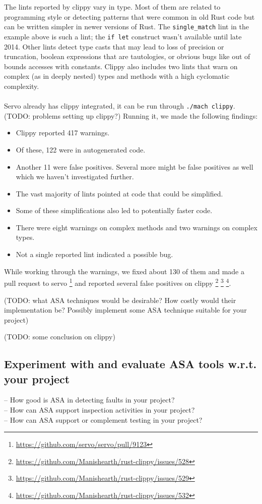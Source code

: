 \documentclass{scrartcl}
\newcommand{\todo}[1] {{\color{red}(TODO: #1)}}
\begin{document}
The lints reported by clippy vary in type. Most of them are related to programming style or detecting patterns that were common in old Rust code but can be written simpler in newer versions of Rust. The \texttt{single\_match} lint in the example above is such a lint; the \texttt{if let} construct wasn't available until late 2014. Other lints detect type casts that may lead to loss of precision or truncation, boolean expressions that are tautologies, or obvious bugs like out of bounds accesses with constants. Clippy also includes two lints that warn on complex (as in deeply nested) types and methods with a high cyclomatic complexity.\\
\\
Servo already has clippy integrated, it can be run through \texttt{./mach clippy}. \todo{problems setting up clippy?} Running it, we made the following findings: 
\begin{itemize}
	\item Clippy reported 417 warnings.
    \item Of these, 122 were in autogenerated code.
    \item Another 11 were false positives. Several more might be false positives as well which we haven't investigated further.
    \item The vast majority of lints pointed at code that could be simplified.
    \item Some of these simplifications also led to potentially faster code.
    \item There were eight warnings on complex methods and two warnings on complex types.
    \item Not a single reported lint indicated a possible bug.
\end{itemize}

While working through the warnings, we fixed about 130 of them and made a pull request to servo \footnote{\url{https://github.com/servo/servo/pull/9123}} and reported several false positives on clippy \footnote{\url{https://github.com/Manishearth/rust-clippy/issues/528}} \footnote{\url{https://github.com/Manishearth/rust-clippy/issues/529}} \footnote{\url{https://github.com/Manishearth/rust-clippy/issues/532}}.


\todo{what ASA techniques would be desirable? How costly would their implementation be? Possibly implement some ASA technique suitable for your project}

\todo{some conclusion on clippy}
\subsection*{Experiment with and evaluate ASA tools w.r.t. your project}
– How good is ASA in detecting faults in your project?\\
– How can ASA support inspection activities in your project? \\
– How can ASA support or complement testing in your project? \\
\end{document}
